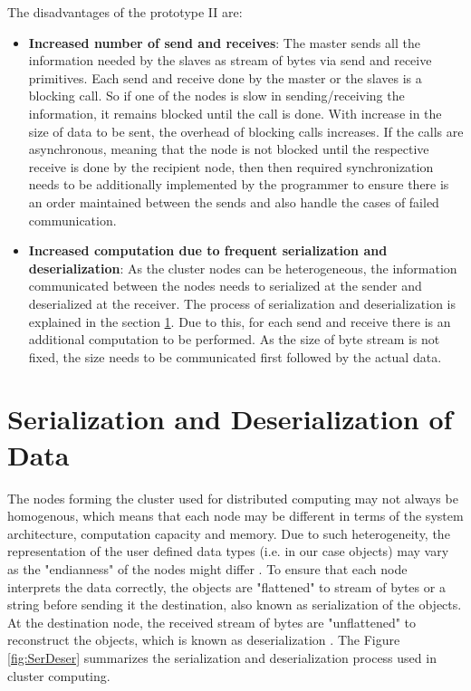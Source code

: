 The disadvantages of the prototype II are: 
\begin{itemize}
\item \textbf{Increased number of send and receives}: The master sends all the information needed by the slaves as stream of bytes via send and receive primitives. Each send and receive done by the master or the slaves is a blocking call. So if one of the nodes is slow in sending/receiving the information, it remains blocked until the call is done. With increase in the size of data to be sent, the overhead of blocking calls increases. If the calls are asynchronous, meaning that the node is not blocked until the respective receive is done by the recipient node, then then required synchronization needs to be additionally implemented by the programmer to ensure there is an order maintained between the sends and also handle the cases of failed communication. 
\item \textbf{Increased computation due to frequent serialization and deserialization}: As the cluster nodes can be heterogeneous, the information communicated between the nodes needs to serialized at the sender and deserialized at the receiver. The process of serialization and deserialization is explained in the section \ref{serdser}. Due to this, for each send and receive there is an additional computation to be performed. As the size of byte stream is not fixed, the size needs to be communicated first followed by the actual data.  
\end{itemize}


\section{Serialization and Deserialization of Data} \label{serdser}

The nodes forming the cluster used for distributed computing may not always be homogenous, which means that each node may be different in terms of the system architecture, computation capacity and memory. Due to such heterogeneity, the representation of the user defined data types (i.e. in our case objects) may vary as the "endianness" of the nodes might differ \cite{ObSerDeser}. To ensure that each node interprets the data correctly, the objects are "flattened" to stream of bytes or a string before sending it the destination, also known as serialization of the objects. At the destination node, the received stream of bytes are "unflattened" to reconstruct the objects, which is known as deserialization \cite{yadav2016system}. The Figure \ref{fig:SerDeser} summarizes the serialization and deserialization process used in cluster computing.


